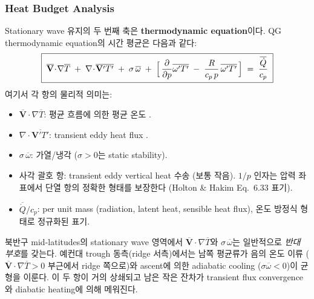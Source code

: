 \subsubsection{Heat Budget Analysis}

Stationary wave 유지의 두 번째 축은 \textbf{thermodynamic equation}이다.
QG thermodynamic equation의 시간 평균은 다음과 같다:
\begin{equation}\label{eq:ch06_sw_heatfull}
  \boxed{\;
  \overline{\mathbf{V}}\!\cdot\!\nabla\overline{T}
  \;+\; \nabla\!\cdot\!\overline{\mathbf{V}'T'}
  \;+\; \sigma\,\overline{\omega}
  \;+\; \Bigl[\,\frac{\partial}{\partial p}\overline{\omega'T'}
              \;-\; \frac{R}{c_p\,p}\,\overline{\omega'T'}\,\Bigr]
  \;=\; \frac{\overline{\dot{Q}}}{c_p}
  \;}
\end{equation}
여기서 각 항의 물리적 의미는:
\begin{itemize}
  \item $\overline{\mathbf{V}}\!\cdot\!\nabla\overline{T}$: 평균 흐름에 의한 평균 온도 .
  \item $\nabla\!\cdot\!\overline{\mathbf{V}'T'}$: transient eddy heat flux .
  \item $\sigma\,\overline{\omega}$:  가열/냉각 ($\sigma > 0$는 static stability).
  \item 사각 괄호 항: transient eddy vertical heat 수송 (보통 작음).
        $1/p$ 인자는 압력 좌표에서 단열 항의 정확한 형태를 보장한다
        (Holton \& Hakim Eq.~6.33 표기).
  \item $\overline{\dot{Q}}/c_p$:  per unit mass
        (radiation, latent heat, sensible heat flux),
        온도 방정식 형태로 정규화된 표기.
\end{itemize}

\begin{remark}\label{rem:ch06_sw_signcancel}
북반구 mid-latitudes의 stationary wave 영역에서
$\overline{\mathbf{V}}\!\cdot\!\nabla\overline{T}$와 $\sigma\,\overline{\omega}$는
일반적으로 \emph{반대 부호}를 갖는다.
예컨대 trough 동측(ridge 서측)에서는 남쪽 평균류가 음의 온도 이류
($\overline{\mathbf{V}}\!\cdot\!\nabla\overline{T} > 0$ 부근에서 ridge 쪽으로)와
ascent에 의한 adiabatic cooling ($\sigma\overline{\omega} < 0$)이 균형을 이룬다.
이 두 항이 거의 상쇄되고 남은 작은 잔차가 transient flux convergence와
diabatic heating에 의해 메워진다.
\end{remark}


